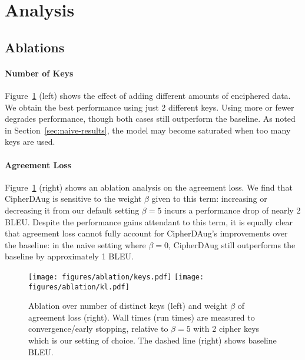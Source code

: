 \documentclass[11pt]{article}
\begin{document}
\section{Analysis}


\subsection{Ablations} 

\label{sec:ablation}
\paragraph{Number of Keys} Figure~\ref{fig:agreement-ablation} (left) shows the effect of adding different amounts of enciphered data. We obtain the best performance using just 2 different keys. Using more or fewer degrades performance, though both cases still outperform the baseline. 
As noted in Section~\ref{sec:naive-results}, the model may become saturated when too many keys are used.

\paragraph{Agreement Loss}
Figure~\ref{fig:agreement-ablation} (right) shows an ablation analysis on the agreement loss. We find that CipherDAug is sensitive to the weight $\beta$ given to this term: increasing or decreasing it from our default setting $\beta=5$ incurs a performance drop of nearly 2 BLEU. 
Despite the performance gains attendant to this term, it is equally clear that agreement loss cannot fully account for CipherDAug's improvements over the baseline: in the naive setting where $\beta=0$, CipherDAug still outperforms the baseline by approximately 1 BLEU. 


\begin{figure}[!ht]
    \centering
    
    \texttt{[image: figures/ablation/keys.pdf]}
    \texttt{[image: figures/ablation/kl.pdf]}
\caption{Ablation over number of distinct keys (left) and weight $\beta$ of agreement loss (right). Wall times (run times) are measured to convergence/early stopping, relative to $\beta = 5$ with 2 cipher keys which is our setting of choice. The dashed line (right) shows baseline BLEU.}
    \label{fig:agreement-ablation}
\end{figure}
\end{document}
